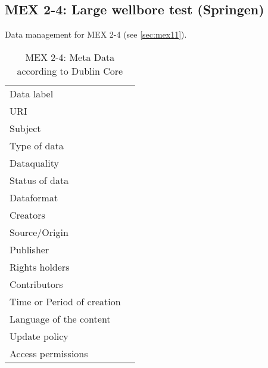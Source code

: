 \subsection{MEX 2-4: Large wellbore test (Springen)}

Data management for MEX 2-4 (see \ref{sec:mex11}).


\begin{table}[!ht]
\caption{MEX 2-4: Meta Data according to Dublin Core}
\label{tab:dms-mex2-4}
\small
\begin{tabular}{R{3cm}|L{7cm}}
\hline
%
Data label &  \\
URI &  \\
Subject  &  \\
Type of data  &  \\
Dataquality  &  \\
Status of data  &  \\
Dataformat  & \\
Creators  &  \\
Source/Origin &  \\
Publisher  &  \\
Rights holders &  \\
Contributors &  \\
Time or Period of creation &  \\
Language of the content &  \\
Update policy &  \\
Access permissions &  \\
%
\hline
\end{tabular}
\end{table}